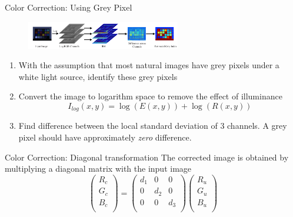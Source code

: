 \documentclass[13pt]{beamer}
\begin{document}
\begin{frame}{Color Correction: Using Grey Pixel}

  \begin{figure}[ht]
      \centering
      \includegraphics[width=0.6\textwidth, height=0.2\textwidth]{figs/greypixel.png}
  \end{figure}

  \begin{enumerate}
    \item With the assumption that most natural images have grey pixels under a
      white light source, identify these grey pixels
    \item Convert the image to logarithm space to remove the effect of illuminance
      \[
        I_{log}(x,y) = \log(E(x,y)) + \log(R(x,y))
      \]
    \item Find difference between the local standard deviation of 3 channels. A
      grey pixel should have approximately \textit{zero} difference.
  \end{enumerate}
\end{frame}

\begin{frame}{Color Correction: Diagonal transformation}
      The corrected image is obtained by multiplying a diagonal matrix with
      the input image
      \[
      \begin{pmatrix}
        R_c \\
        G_c \\
        B_c \\
      \end{pmatrix}
      =
      \begin{pmatrix}
        d_1 & 0 & 0 \\
        0 & d_2 & 0 \\
        0 & 0 & d_3\\
      \end{pmatrix}
      \begin{pmatrix}
        R_u \\
        G_u \\
        B_u \\
      \end{pmatrix}
      \]
\end{frame}
\end{document}
